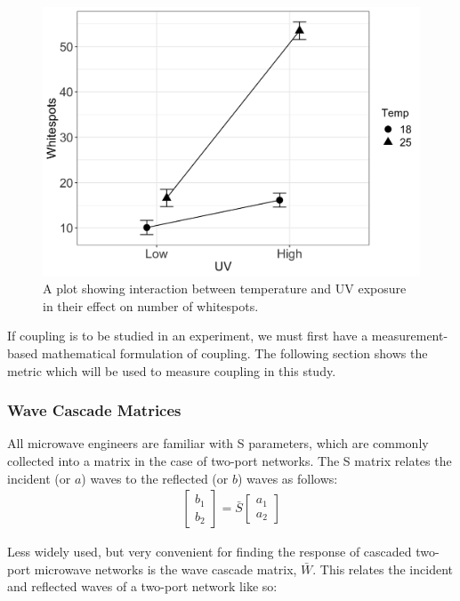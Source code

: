 \documentclass[12pt]{usfcoe}
\begin{document}
    \begin{figure}[H]
		\begin{center}
        	\includegraphics[width=4.5in]{images/ANOVA/gg_interaction-example-1.png} 
			\caption{A plot showing interaction between temperature and UV exposure in their effect on number of whitespots. } 
			\label{fig:interaction_example}
		\end{center}
	\end{figure}    
    
    
    
       If coupling is to be studied in an experiment, we must first have a
    measurement-based mathematical formulation of coupling. The following
    section shows the metric which will be used to measure coupling in this study.

    \subsubsection{Wave Cascade Matrices}
    All microwave engineers are familiar with S parameters, which are commonly collected into a matrix in the case of two-port networks. 
    The S matrix relates the incident (or \(a\)) waves to the reflected (or \(b\))
    waves as follows:
    \begin{gather}
     \begin{bmatrix} b_1 \\ b_2 \end{bmatrix}
     =
      \bar S 
      \begin{bmatrix} a_1 \\ a_2  \end{bmatrix}
    \end{gather}
    
    Less widely used, but very convenient for finding the response of cascaded two-port microwave networks is the wave cascade matrix, \(\bar W\). 
    This relates the incident and reflected waves of a two-port network like so:
    
\end{document}
